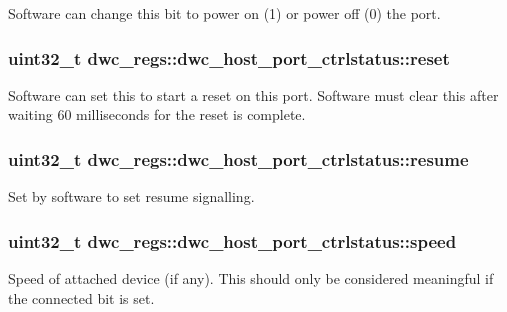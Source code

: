 Software can change this bit to power on (1) or power off (0) the port. \hypertarget{uniondwc__regs_1_1dwc__host__port__ctrlstatus_a94625e71960841a1540af9df89f5c70a}{
\subsubsection[{reset}]{\setlength{\rightskip}{0pt plus 5cm}uint32\-\_\-t dwc\-\_\-regs\-::dwc\-\_\-host\-\_\-port\-\_\-ctrlstatus\-::reset}}\label{uniondwc__regs_1_1dwc__host__port__ctrlstatus_a94625e71960841a1540af9df89f5c70a}
Software can set this to start a reset on this port. Software must clear this after waiting 60 milliseconds for the reset is complete. \hypertarget{uniondwc__regs_1_1dwc__host__port__ctrlstatus_ae49410371fc53a414f17a7e62b8290a4}{
\subsubsection[{resume}]{\setlength{\rightskip}{0pt plus 5cm}uint32\-\_\-t dwc\-\_\-regs\-::dwc\-\_\-host\-\_\-port\-\_\-ctrlstatus\-::resume}}\label{uniondwc__regs_1_1dwc__host__port__ctrlstatus_ae49410371fc53a414f17a7e62b8290a4}
Set by software to set resume signalling. \hypertarget{uniondwc__regs_1_1dwc__host__port__ctrlstatus_aa81595e89f5505a3ae023296254ba8b2}{
\subsubsection[{speed}]{\setlength{\rightskip}{0pt plus 5cm}uint32\-\_\-t dwc\-\_\-regs\-::dwc\-\_\-host\-\_\-port\-\_\-ctrlstatus\-::speed}}\label{uniondwc__regs_1_1dwc__host__port__ctrlstatus_aa81595e89f5505a3ae023296254ba8b2}
Speed of attached device (if any). This should only be considered meaningful if the connected bit is set.

